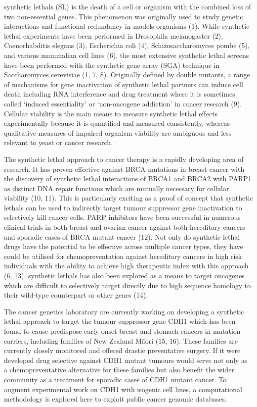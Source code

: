 \Glspl{synthetic lethal} (SL) is the death of a cell or organism with the combined loss of two non-essential genes. This phenomenon was originally used to study genetic interactions and functional redundancy in models organisms (1). While \gls{synthetic lethal} experiments have been performed in Drosophila melanogaster (2), Caenorhabditis elegans (3), Escherichia coli (4), Schizosaccharomyces pombe (5), and various mammalian cell lines (6), the most extensive \gls{synthetic lethal} screens have been performed with the synthetic gene array (SGA) technique in Saccharomyces cerevisiae (1, 7, 8). Originally defined by double mutants, a range of mechanisms for gene inactivation of \gls{synthetic lethal} partners can induce cell death including \gls{RNA} interference and drug treatment where it is sometimes called ‘induced essentiality’ or ‘non-oncogene addiction’ in cancer research (9). Cellular viability is the main means to measure \gls{synthetic lethal} effects experimentally because it is quantified and measured consistently, whereas qualitative measures of impaired organism viability are ambiguous and less relevant to yeast or cancer research.

The \gls{synthetic lethal} approach to cancer therapy is a rapidly developing area of research. It has proven effective against BRCA mutations in breast cancer with the discovery of \gls{synthetic lethal} interactions of BRCA1 and BRCA2 with PARP1 as distinct DNA repair functions which are mutually necessary for cellular viability (10, 11). This is particularly exciting as a proof of concept that \glspl{synthetic lethal} can be used to indirectly target tumour suppressor gene inactivation to selectively kill cancer cells. PARP inhibitors have been successful in numerous clinical trials in both breast and ovarian cancer against both hereditary cancers and sporadic cases of BRCA mutant cancer (12). Not only do \gls{synthetic lethal} drugs have the potential to be effective across multiple cancer types, they have could be utilised for chemopreventation against hereditary cancers in high risk individuals with the ability to achieve high therapeutic index with this approach (6, 13). \Glspl{synthetic lethal} has also been explored as a means to target oncogenes which are difficult to selectively target directly due to high sequence homology to their wild-type counterpart or other genes (14).

The cancer genetics laboratory are currently working on developing a \gls{synthetic lethal} approach to target the tumour suppressor gene CDH1 which has been found to cause predispose early-onset breast and stomach cancers in mutation carriers, including families of New Zealand M\={a}ori (15, 16). These families are currently closely monitored and offered drastic preventative surgery. If it were developed drug selective against CDH1 mutant tumours would serve not only as a chemopreventative alternative for these families but also benefit the wider community as a treatment for sporadic cases of CDH1 mutant cancer. To augment experimental work on CDH1 with isogenic cell lines, a computational methodology is explored here to exploit public cancer genomic databases.


